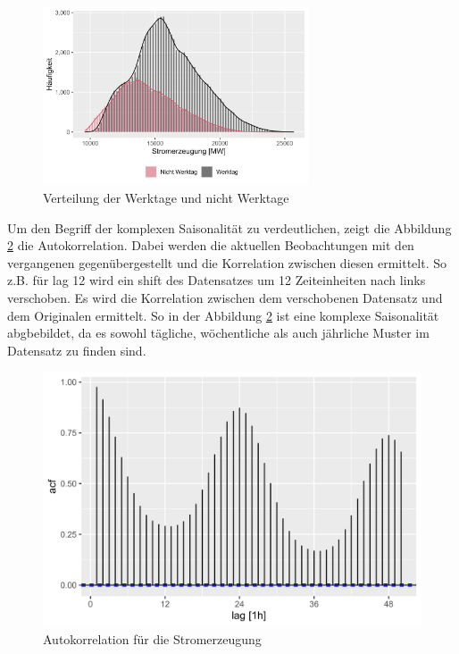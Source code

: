 \documentclass[11pt,ngerman,a4paper,]{article}
\begin{document}
\begin{figure}[H]
\centering
\includegraphics[width=0.7\textwidth]{plots/workday_histogram}
\caption{Verteilung der Werktage und nicht Werktage}
\label{fig:workday_histogram}
\end{figure}

Um den Begriff der komplexen Saisonalität zu verdeutlichen, zeigt die Abbildung \ref{fig:acf} die Autokorrelation. Dabei werden die aktuellen Beobachtungen mit den vergangenen gegenübergestellt und die Korrelation zwischen diesen ermittelt. So z.B. für lag 12 wird ein shift des Datensatzes um 12 Zeiteinheiten nach links verschoben. Es wird die Korrelation zwischen dem verschobenen Datensatz und dem Originalen ermittelt. So in der Abbildung \ref{fig:acf} ist eine komplexe Saisonalität abgbebildet, da es sowohl tägliche, wöchentliche als auch jährliche Muster im Datensatz zu finden sind.

\begin{figure}[H]
\centering
\includegraphics[width=1.0\textwidth]{plots/autocorrelation}
\caption{Autokorrelation für die Stromerzeugung}
\label{fig:acf}
\end{figure}
\end{document}
